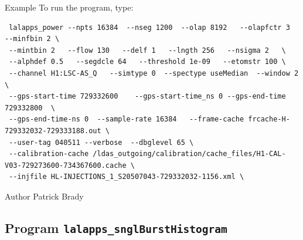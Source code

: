 \begin{entry}
\item[Example]
To run the program,  type:
\begin{verbatim}
 lalapps_power --npts 16384  --nseg 1200  --olap 8192   --olapfctr 3   --minfbin 2 \
 --mintbin 2   --flow 130   --delf 1   --lngth 256   --nsigma 2   \
 --alphdef 0.5   --segdcle 64   --threshold 1e-09   --etomstr 100 \
 --channel H1:LSC-AS_Q   --simtype 0  --spectype useMedian  --window 2 \
 --gps-start-time 729332600    --gps-start-time_ns 0 --gps-end-time 729332800  \
 --gps-end-time-ns 0  --sample-rate 16384   --frame-cache frcache-H-729332032-729333188.out \
 --user-tag 040511 --verbose  --dbglevel 65 \
 --calibration-cache /ldas_outgoing/calibration/cache_files/H1-CAL-V03-729273600-734367600.cache \
 --injfile HL-INJECTIONS_1_S20507043-729332032-1156.xml \
\end{verbatim}

\item[Author]
Patrick Brady
\end{entry}
\clearpage

\subsection{Program \texttt{lalapps\_snglBurstHistogram}}
\label{program:lalapps-snglBurstHistogram}

